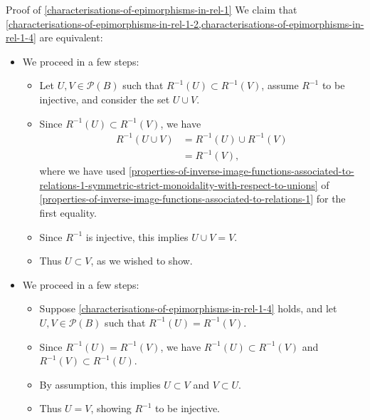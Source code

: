 \begin{Proof}{Proof of \cref{characterisations-of-epimorphisms-in-rel-1}}
    We claim that \cref{characterisations-of-epimorphisms-in-rel-1-2,characterisations-of-epimorphisms-in-rel-1-4} are equivalent:
    \begin{itemize}
        \item{}We proceed in a few steps:
            \begin{itemize}
                \item Let $U,V\in\mathcal{P}(B)$ such that $R^{-1}(U)\subset R^{-1}(V)$, assume $R^{-1}$ to be injective, and consider the set $U\cup V$.
                \item Since $R^{-1}(U)\subset R^{-1}(V)$, we have
                    \begin{align*}
                        R^{-1}(U\cup V) &= R^{-1}(U)\cup R^{-1}(V)\\
                                        &= R^{-1}(V),
                    \end{align*}
                    where we have used \cref{properties-of-inverse-image-functions-associated-to-relations-1-symmetric-strict-monoidality-with-respect-to-unions} of \cref{properties-of-inverse-image-functions-associated-to-relations-1} for the first equality.
                \item Since $R^{-1}$ is injective, this implies $U\cup V=V$.
                \item Thus $U\subset V$, as we wished to show.
            \end{itemize}
        \item{}We proceed in a few steps:
            \begin{itemize}
                \item Suppose \cref{characterisations-of-epimorphisms-in-rel-1-4} holds, and let $U,V\in\mathcal{P}(B)$ such that $R^{-1}(U)=R^{-1}(V)$.
                \item Since $R^{-1}(U)=R^{-1}(V)$, we have $R^{-1}(U)\subset R^{-1}(V)$ and $R^{-1}(V)\subset R^{-1}(U)$.
                \item By assumption, this implies $U\subset V$ and $V\subset U$.
                \item Thus $U=V$, showing $R^{-1}$ to be injective.
            \end{itemize}
    \end{itemize}


\end{Proof}
